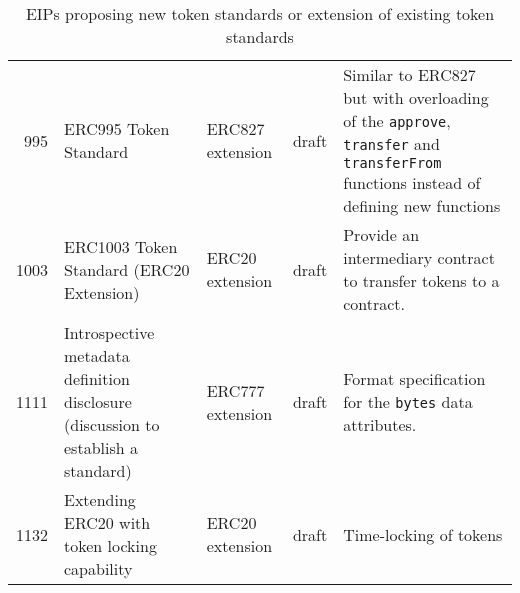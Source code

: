 \begin{table}
{\begin{tabular}{r p{3.5cm} >{\centering}p{2cm} c p{6cm}}
 995 & ERC995 Token Standard & ERC827 extension & draft & Similar to ERC827 but with overloading of the \texttt{approve}, \texttt{transfer} and \texttt{transferFrom} functions instead of defining new functions \\
1003 & ERC1003 Token Standard (ERC20 Extension) & ERC20 extension & draft & Provide an intermediary contract to transfer tokens to a contract. \\
1111 & Introspective metadata definition disclosure (discussion to establish a standard) & ERC777 extension & draft & Format specification for the \texttt{bytes} data attributes.\\
1132 & Extending ERC20 with token locking capability & ERC20 extension & draft & Time-locking of tokens \\
\hline
  \end{tabular}
  }
  \caption{EIPs proposing new token standards or extension of existing token standards}
  \label{tbl:standards}
\end{table}
